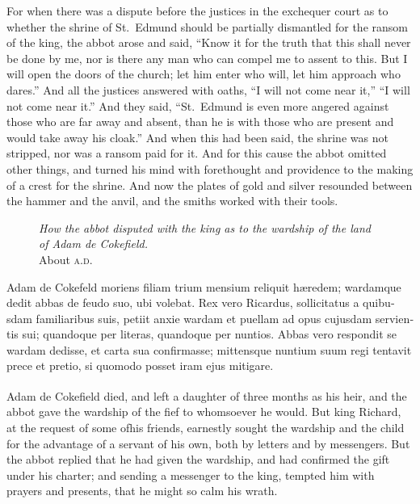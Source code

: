 \documentclass{book}
\newcounter{engnote}
\newcommand{\engnotenum}{\textsuperscript{\arabic{engnote}\stepcounter{engnote}}}
\newcommand{\engnotetext}[1]{\vphantom{\footnotemark{}}\footnotetext{#1}}
\newcommand{\blockhead}[4][]{
\begin{figure}
\centering
\vspace{#4}
\parbox{2.75cm}{\begin{center}\footnotesize \color{BrickRed} \emph{#2}\\ #1 \end{center}}
\end{figure}
}
\begin{document}
\begin{paracol}{2}
\switchcolumn

For when there was a dispute before the justices in the exchequer court as to whether the shrine of St.\ Edmund should be partially dismantled for the ransom of the king, the abbot arose and said, ``Know it for the truth that this shall never be done by me, nor is there any man who can compel me to assent to this. But I will open the doors of the church; let him enter who will, let him approach who dares.'' And all the justices answered with oaths, ``I will not come near it,'' ``I will not come near it.'' And they said, ``St.\ Edmund is even more angered against those who are far away and absent, than he is with those who are present and would take away his cloak.'' And when this had been said, the shrine was not stripped, nor was a ransom paid for it. And for this cause the abbot omitted other things, and turned his mind with forethought and providence to the making of a crest for the shrine. And now the plates of gold and silver resounded between the hammer and the anvil, and the smiths worked with their tools.

\switchcolumn*

\begin{otherlanguage}{latin}
\blockhead[About \textsc{a.d}.\ ]{How the abbot disputed with the king as to the wardship of the land of Adam de Cokefield.}{5}{-.6cm} 
Adam de Cokefeld moriens\engnotetext{add long note here} filiam trium mensium reliquit h\ae{}redem; wardamque dedit abbas de feudo suo, ubi volebat. Rex vero Ricardus, sollicitatus a quibusdam familiaribus suis, petiit anxie wardam et puellam ad opus cujusdam servientis sui; quandoque per literas, quandoque per nuntios. Abbas vero respondit se wardam dedisse, et carta sua confirmasse; mittensque nuntium suum regi tentavit prece et pretio, si quomodo posset iram ejus mitigare. 

\end{otherlanguage}

\switchcolumn

Adam de Cokefield died,\engnotenum{} and left a daughter of three months as his heir, and the abbot gave the wardship of the fief to whomsoever he would. But king Richard, at the request of some ofhis friends, earnestly sought the wardship and the child for the advantage of a servant of his own, both by letters and by messengers. But the abbot replied that he had given the wardship, and had confirmed the gift under his charter; and sending a messenger to the king, tempted him with prayers and presents, that he might so calm his wrath.


\end{paracol}
\end{document}
